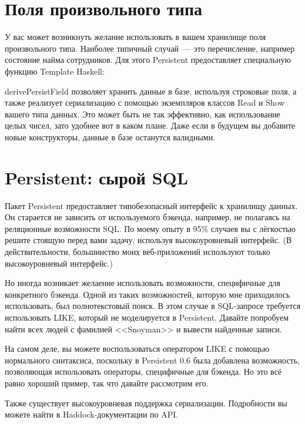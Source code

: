 \section{Поля произвольного типа}

У вас может возникнуть желание использовать в вашем хранилище поля произвольного типа. Наиболее типичный случай~--- это перечисление, например состояние найма сотрудников. Для этого Persistent предоставляет специальную функцию Template Haskell:


derivePersistField позволяет хранить данные в базе, используя строковые поля, а также реализует сериализацию с помощью экземпляров классов Read и Show вашего типа данных. Это может быть не так эффективно, как использование целых чисел, зато удобнее вот в каком плане. Даже если в будущем вы добавите новые конструкторы, данные в базе останутся валидными.

\section{Persistent: сырой SQL}

Пакет Persistent предоставляет типобезопасный интерфейс к хранилищу данных. Он старается не зависить от используемого бэкенда, например, не полагаясь на реляционные возможности SQL. По моему опыту в 95\% случаев вы с лёгкостью решите стоящую перед вами задачу, используя высокоуровневый интерфейс. (В действительности, большинство моих веб-приложений используют только высокоуровневый интерфейс.)

Но иногда возникает желаение использовать возможности, специфичные для конкретного бэкенда. Одной из таких возможностей, которую мне приходилось использовать, был полнотекстовый поиск. В этом случае в SQL-запросе требуется использовать LIKE, который не моделируется в Persistent. Давайте попробуем найти всех людей с фамилией <<Snoyman>> и вывести найденные записи.

\begin{remark}
На самом деле, вы можете воспользоваться оператором LIKE с помощью нормального синтаксиса, поскольку в Persistent 0.6 была добавлена возможность, позволяющая использовать операторы, специфичные для бэкенда. Но это всё равно хороший пример, так что давайте рассмотрим его.
\end{remark}


Также существует высокоуровневая поддержка сериализации. Подробности вы можете найти в Haddock-документации по API.

